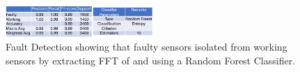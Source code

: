 \begin{figure}
	\centering
	\includegraphics[width=0.5\textwidth]{figures/classification/FaultDetectionResults.png}
	\caption{\footnotesize Fault Detection showing that faulty sensors isolated from working sensors by extracting FFT of \aout and using a Random Forest Classifier.}
	\label{fault_detection_results}
\end{figure}


